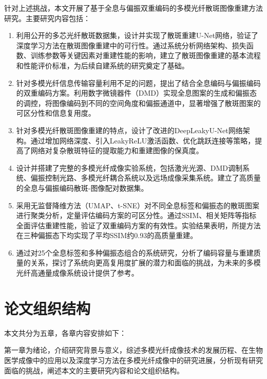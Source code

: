 {针对上述挑战，本文开展了基于全息与偏振双重编码的多模光纤散斑图像重建方法研究。主要研究内容包括：

\begin{enumerate}
    \item 利用公开的多芯光纤散斑数据集\citep{sun2024ol_calibrationfree,sun2023_figshare_dataset1,sun2023_figshare_dataset2}，设计并实现了散斑重建U-Net网络，验证了深度学习方法在散斑图像重建中的可行性。通过系统分析网络架构、损失函数、训练参数等关键因素对重建性能的影响，建立了散斑图像重建的基本流程和性能评价标准，为后续自建系统的研究奠定了基础。
    
    \item 针对多模光纤信息传输容量利用不足的问题，提出了结合全息编码与偏振编码的双重编码方案。利用数字微镜器件（DMD）实现全息图案的生成和偏振态的调控，将图像编码到不同的空间角度和偏振通道中，显著增强了散斑图案的可区分性和信息复用度。
    
    \item 针对多模光纤散斑图像重建的特点，设计了改进的DeepLeakyU-Net网络架构。通过增加网络深度、引入LeakyReLU激活函数、优化跳跃连接等策略，提高了网络对复杂散斑特征的提取能力和重建图像的保真度。
    
    \item 设计并搭建了完整的多模光纤成像实验系统，包括激光光源、DMD调制系统、偏振控制光路、多模光纤耦合系统以及远场成像采集系统。建立了高质量的全息与偏振编码散斑-图像配对数据集。
    
    \item 采用无监督降维方法（UMAP、t-SNE）对不同全息标签和偏振态的散斑图案进行聚类分析，定量评估编码方案的可区分性。通过SSIM、相关矩阵等指标全面评估重建性能，验证了双重编码方案的有效性。实验结果表明，所提方法在三种偏振态下均实现了平均SSIM约0.93的高质量重建。
    
    \item 通过对25个全息标签和多种偏振态组合的系统研究，分析了编码容量与重建质量的关系，探讨了系统向更高复用度扩展的潜力和面临的挑战，为未来的多模光纤高通量成像系统设计提供了参考。
\end{enumerate}


\section{论文组织结构}\label{sec:organization}

本文共分为五章，各章内容安排如下：

第一章为绪论，介绍研究背景与意义，综述多模光纤成像技术的发展历程、在生物医学成像中的应用以及深度学习方法在多模光纤成像中的研究进展，分析现有研究面临的挑战，阐述本文的主要研究内容和论文组织结构。

}
